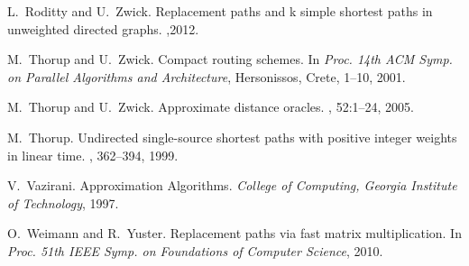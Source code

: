 \documentclass[12pt]{article}
\begin{document}
\begin{thebibliography}{10}
L.~Roditty and U.~Zwick.
\newblock Replacement paths and k simple shortest paths in unweighted directed graphs.
 ,2012.


M.~Thorup and U.~Zwick.
\newblock Compact routing schemes.
\newblock
In {\em Proc. 14th ACM Symp. on Parallel Algorithms and Architecture}, Hersonissos, Crete,
1--10, 2001.

M.~Thorup and U.~Zwick.
\newblock Approximate distance oracles.
, 52:1--24, 2005.

M.~Thorup.
\newblock Undirected single-source shortest paths with positive integer weights in linear time.
, 362--394, 1999.

V.~Vazirani.
\newblock Approximation Algorithms.
\newblock
{\em College of Computing, Georgia Institute of Technology},
1997.

O.~Weimann and R.~Yuster.
\newblock Replacement paths via fast matrix multiplication.
\newblock
In {\em Proc. 51th IEEE Symp. on Foundations of Computer Science},
2010.


\end{thebibliography}
\end{document}
